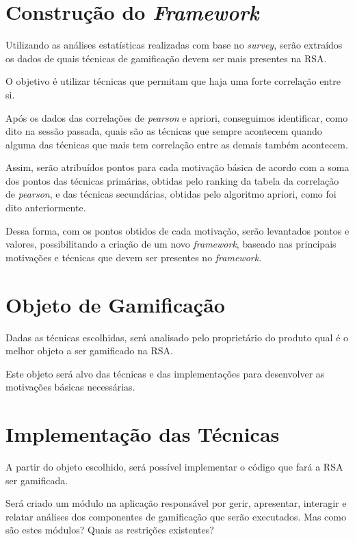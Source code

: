 \section{Construção do \textit{Framework}}
\label{sub:constru_o_do_framework}
Utilizando as análises estatísticas realizadas com base no \textit{survey}, serão extraídos os dados de quais técnicas de gamificação
devem ser mais presentes na RSA.

O objetivo é  utilizar técnicas que permitam que haja uma forte correlação entre si.

Após os dados das correlações de \textit{pearson} e apriori, conseguimos identificar, como dito na sessão passada, quais são as técnicas
que sempre acontecem quando alguma das técnicas que mais tem correlação entre as demais também acontecem.

Assim, serão atribuídos pontos para cada motivação básica de acordo com a soma dos pontos das técnicas primárias, obtidas pelo ranking da
tabela da correlação de \textit{pearson}, e das técnicas secundárias, obtidas pelo algoritmo apriori, como foi dito anteriormente.

Dessa forma, com os pontos obtidos de cada motivação, serão levantados pontos e valores, possibilitando a criação de um novo \textit{framework},
baseado nas principais motivações e técnicas que devem ser presentes no \textit{framework}.

\section{Objeto de Gamificação}
\label{sub:objeto_de_gamifica_o}
Dadas as técnicas escolhidas, será analisado pelo proprietário do produto qual é o melhor objeto a ser gamificado na RSA.

Este objeto será alvo das técnicas e das implementações para desenvolver as motivações básicas necessárias.


\section{Implementação das Técnicas}
\label{sub:implementa_o_das_t_cnicas}
A partir do objeto escolhido, será possível implementar o código que fará a RSA ser gamificada.

Será criado um módulo na aplicação responsável por gerir, apresentar, interagir e relatar análises
dos componentes de gamificação que serão executados. Mas como são estes módulos? Quais as restrições existentes?

